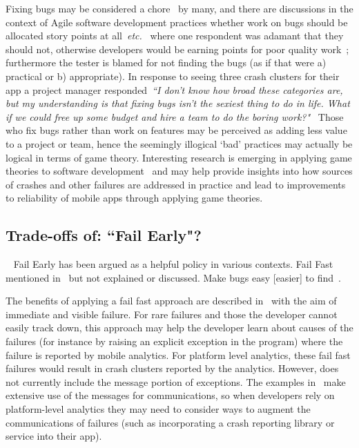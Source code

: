 Fixing bugs may be considered a chore~ by many, and there are discussions in the context of Agile software development practices whether work on bugs should be allocated story points at all~\emph{etc.}~ where one respondent was adamant that they should not, otherwise developers would be earning points for poor quality work~; furthermore the tester is blamed for not finding the bugs (as if that were a) practical or b) appropriate). In response to seeing three crash clusters for their app a project manager responded~\emph{``I don’t know how broad these categories are, but my understanding is that fixing bugs isn’t the sexiest thing to do in life. What if we could free up some budget and hire a team to do the boring work?"}~  Those who fix bugs rather than work on features may be perceived as adding less value to a project or team, hence the seemingly illogical `bad' practices may actually be logical in terms of game theory. Interesting research is emerging in applying game theories to software development~ and may help provide insights into how sources of crashes and other failures are addressed in practice and lead to improvements to reliability of mobile apps through applying game theories.


\subsection{Trade-offs of: ``Fail Early"?}~\label{discussion-tradeoffs-of-fail-early-topic}
Fail Early has been argued as a helpful policy in various contexts. %
Fail Fast mentioned in~ but not explained or discussed. Make bugs easy [easier] to find~.

The benefits of applying a fail fast approach are described in~ with the aim of immediate and visible failure. For rare failures and those the developer cannot easily track down, this approach may help the developer learn about causes of the failures (for instance by raising an explicit exception in the program) where the failure is reported by mobile analytics. For platform level analytics, these fail fast failures would result in crash clusters reported by the analytics. However,  does not currently include the message portion of exceptions. The examples in~ make extensive use of the messages for communications, so when developers rely on platform-level analytics they may need to consider ways to augment the communications of failures (such as incorporating a crash reporting library or service into their app).


